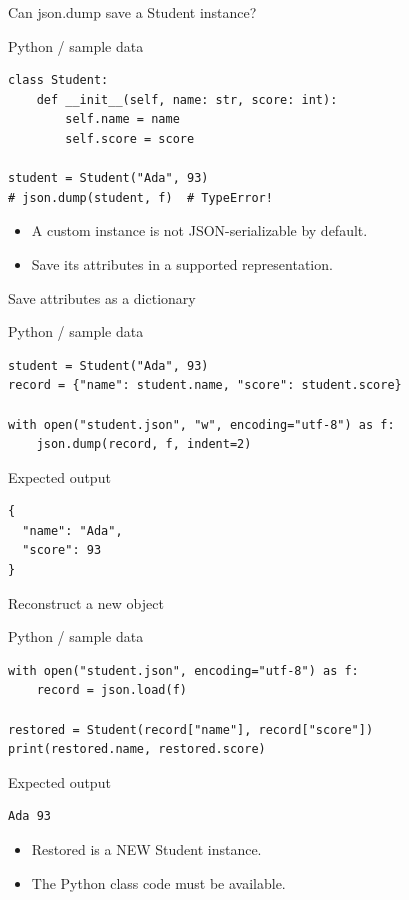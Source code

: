 \documentclass[aspectratio=169,10pt]{beamer}
\begin{document}
\begin{frame}[fragile]{Can json.dump save a Student instance?}
\begin{block}{Python / sample data}\begin{Verbatim}[fontsize=\scriptsize]
class Student:
    def __init__(self, name: str, score: int):
        self.name = name
        self.score = score

student = Student("Ada", 93)
# json.dump(student, f)  # TypeError!
\end{Verbatim}
\end{block}
\small\begin{itemize}
\item A custom instance is not JSON-serializable by default.
\item Save its attributes in a supported representation.
\end{itemize}
\end{frame}
\begin{frame}[fragile]{Save attributes as a dictionary}
\begin{block}{Python / sample data}\begin{Verbatim}[fontsize=\footnotesize]
student = Student("Ada", 93)
record = {"name": student.name, "score": student.score}

with open("student.json", "w", encoding="utf-8") as f:
    json.dump(record, f, indent=2)
\end{Verbatim}
\end{block}
\vspace{-0.07in}\begin{block}{Expected output}\begin{Verbatim}[fontsize=\scriptsize]
{
  "name": "Ada",
  "score": 93
}
\end{Verbatim}
\end{block}
\end{frame}
\begin{frame}[fragile]{Reconstruct a new object}
\begin{block}{Python / sample data}\begin{Verbatim}[fontsize=\footnotesize]
with open("student.json", encoding="utf-8") as f:
    record = json.load(f)

restored = Student(record["name"], record["score"])
print(restored.name, restored.score)
\end{Verbatim}
\end{block}
\vspace{-0.07in}\begin{block}{Expected output}\begin{Verbatim}[fontsize=\scriptsize]
Ada 93
\end{Verbatim}
\end{block}
\small\begin{itemize}
\item Restored is a NEW Student instance.
\item The Python class code must be available.
\end{itemize}
\end{frame}
\end{document}
